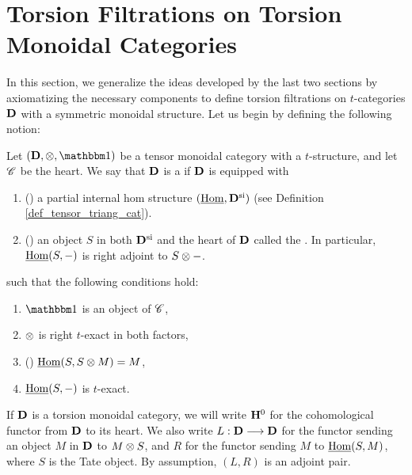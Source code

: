 \newpage
\chapter{Torsion Filtrations on Torsion Monoidal Categories}
\label{sect_filtration_general}

In this section, we generalize the ideas developed by the last
two sections by axiomatizing the necessary components to define
torsion filtrations on $t$-categories $\mathbf{D}$ with a symmetric
monoidal structure. Let us begin by defining the following notion:

\begin{defn}\label{def_torsion_monoidal_category}
Let $(\DCat, \tensor, \Unit)$ be a tensor monoidal category with 
a $t$-structure, and let $\mathscr{C}$ be the heart. We say that 
$\mathbf{D}$ is a  if $\mathbf{D}$ is 
equipped with 
\begin{enumerate}
\item () a partial internal hom
structure $(\underline{\mathrm{Hom}}, \mathbf{D}^{\mathrm{si}})$ (see Definition
\ref{def_tensor_triang_cat}).

\item () an object $S$ in both 
   $\mathbf{D}^{\mathrm{si}}$ and the heart of $\mathbf{D}$ called the 
   . In particular, $\underline{\mathrm{Hom}}(S, -)$ is right
   adjoint to $S \otimes -$.
\end{enumerate}

\noindent such that the following conditions hold:

\begin{enumerate}
\item $\Unit$ is an object of $\mathscr{C}$,

\item $\otimes$ is right $t$-exact in both factors,

\item () $\underline{\mathrm{Hom}}(S, S \otimes M) = M$,

\item $\underline{\mathrm{Hom}}(S, -)$ is $t$-exact.
\end{enumerate}
\end{defn}

If $\mathbf{D}$ is a torsion monoidal category, we will write $\mathbf{H}^0$
for the cohomological functor from $\mathbf{D}$ to its heart. We also 
write $L: \mathbf{D} \longrightarrow \mathbf{D}$ for the functor sending an object $M$ 
in $\mathbf{D}$ to $M \otimes S$, and $R$ for the functor sending $M$
to $\underline{\mathrm{Hom}}(S, M)$, where $S$ is the Tate object. By assumption,
$(L, R)$ is an adjoint pair.

